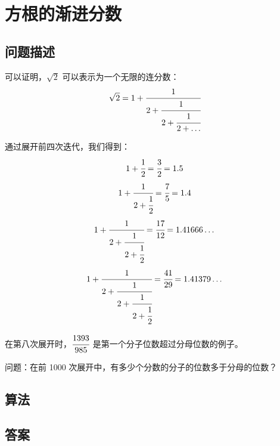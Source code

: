 \section{方根的渐进分数}
\subsection{问题描述}
\begin{tcolorbox}
可以证明，$\sqrt{2}$ 可以表示为一个无限的连分数：
\[
\sqrt{2} = 1 + \cfrac{1}{2 + \cfrac{1}{2 + \cfrac{1}{2 + \dots}}}
\]

通过展开前四次迭代，我们得到：
\[
1 + \cfrac{1}{2} = \cfrac{3}{2} = 1.5
\]
\[
1 + \cfrac{1}{2 + \cfrac{1}{2}} = \cfrac{7}{5} = 1.4
\]
\[
1 + \cfrac{1}{2 + \cfrac{1}{2 + \cfrac{1}{2}}} = \cfrac{17}{12} = 1.41666 \dots
\]
\[
1 + \cfrac{1}{2 + \cfrac{1}{2 + \cfrac{1}{2 + \cfrac{1}{2}}}} = \cfrac{41}{29} = 1.41379 \dots
\]

在第八次展开时，$\cfrac{1393}{985}$ 是第一个分子位数超过分母位数的例子。

问题：在前 1000 次展开中，有多少个分数的分子的位数多于分母的位数？
\end{tcolorbox}

\subsection{算法}


\subsection{答案}
